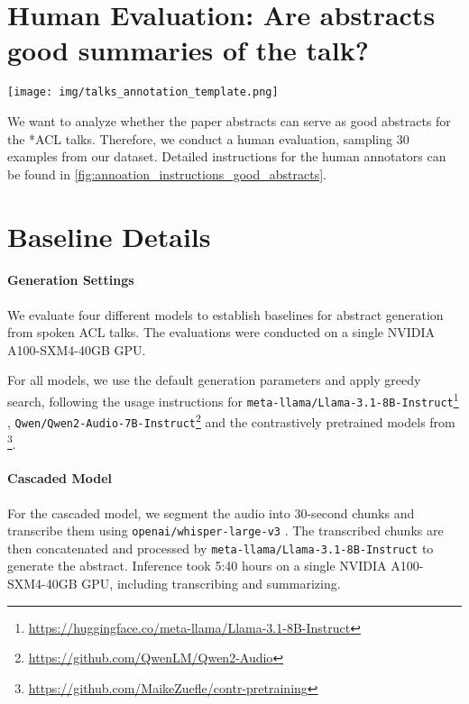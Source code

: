 \clearpage
\appendix




\section{Human Evaluation: Are abstracts good summaries of the talk? }\label{app:human_eval_good_abstracts}
\begin{figure*}
    \centering
    \texttt{[image: img/talks\_annotation\_template.png]}
    \caption{Instructions for annotators to evaluate whether the paper abstracts are good and informative abstracts for the ACL talks.}
    \label{fig:annoation_instructions_good_abstracts}
\end{figure*}

We want to analyze whether the paper abstracts can serve as good abstracts for the  *ACL talks. Therefore, we conduct a human evaluation, sampling 30 examples from our dataset. Detailed instructions for the human annotators can be found in \cref{fig:annoation_instructions_good_abstracts}.


\section{Baseline Details}\label{sec:app:baselines}
\paragraph{Generation Settings}
We evaluate four different models to establish baselines for abstract generation from spoken ACL talks. The evaluations were conducted on a single NVIDIA A100-SXM4-40GB GPU.

For all models, we use the default generation parameters and apply greedy search, following the usage instructions for \texttt{meta-llama/Llama-3.1-8B-Instruct}\footnote{\label{footnote_llama_url}\url{https://huggingface.co/meta-llama/Llama-3.1-8B-Instruct}} \citep{dubey2024llama3herdmodels}, \texttt{Qwen/Qwen2-Audio-7B-Instruct}\footnote{\label{footnote_qwen_url}\url{https://github.com/QwenLM/Qwen2-Audio}} \citep{chu2024qwen2audiotechnicalreport} and the contrastively pretrained models from \citet{züfle2024contrastivelearningtaskindependentspeechllmpretraining}\footnote{\label{footnote_llava_url}\url{https://github.com/MaikeZuefle/contr-pretraining}}.

\paragraph{Cascaded Model}
For the cascaded model, we segment the audio into 30-second chunks and transcribe them using \texttt{openai/whisper-large-v3} \citep{radford2022robustspeechrecognitionlargescale}. The transcribed chunks are then concatenated and processed by \texttt{meta-llama/Llama-3.1-8B-Instruct} \citep{dubey2024llama3herdmodels} to generate the abstract.  Inference took 5:40 hours on a single NVIDIA A100-SXM4-40GB GPU, including transcribing and summarizing.

